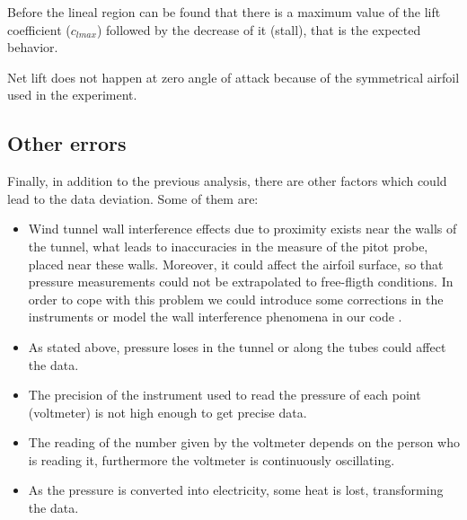 \documentclass[10pt]{SelfArx} %
\begin{document}
Before the lineal region can be found that there is a maximum value of the lift coefficient ($c_{lmax}$) followed by the decrease of it (stall), that is the expected behavior.

Net lift does not happen at zero angle of attack because of the symmetrical airfoil used in the experiment.

\subsection{Other errors}

Finally, in addition to the previous analysis, there are other factors which could lead to the data deviation. Some of them are:

\begin{itemize}

\item Wind tunnel wall interference effects due to proximity exists near the walls of the tunnel, what leads to inaccuracies in the measure of the pitot probe, placed near these walls. Moreover, it could affect the airfoil surface, so that pressure measurements could not be extrapolated to free-fligth conditions. In order to cope with this problem we could introduce some corrections in the instruments or model the wall interference phenomena in our code \cite{Duraisamy:wall-interference}.

\item As stated above, pressure loses in the tunnel or along the tubes could affect the data.

\item The precision of the instrument used to read the pressure of each point (voltmeter) is not high enough to get precise data. 

\item The reading of the number given by the voltmeter depends on the person who is reading it, furthermore the voltmeter is continuously oscillating. 

\item As the pressure is converted into electricity, some heat is lost, transforming the data.

\end{itemize}




\end{document}
